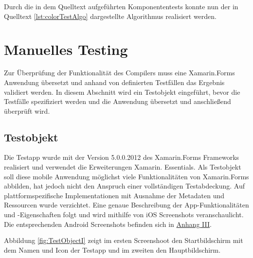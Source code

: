 Durch die in dem Quelltext aufgeführten Komponententests konnte nun der in Quelltext \ref{lst:colorTestAlgo} dargestellte Algorithmus realisiert werden. 
\newpage



\section{Manuelles Testing}
Zur Überprüfung der Funktionalität des Compilers muss eine Xamarin.Forms Anwendung übersetzt und anhand von definierten Testfällen das Ergebnis validiert werden.  In diesem Abschnitt wird ein Testobjekt eingeführt,  bevor die Testfälle spezifiziert werden und die Anwendung übersetzt und anschließend überprüft wird. 

\subsection{Testobjekt}
Die Testapp wurde mit der Version 5.0.0.2012 des Xamarin.Forms Frameworks realisiert und verwendet die Erweiterungen Xamarin. Essentials.  Als Testobjekt soll diese mobile Anwendung möglichst viele Funktionalitäten von Xamarin.Forms abbilden,  hat jedoch nicht den Anspruch einer vollständigen Testabdeckung.
Auf plattformspezifische Implementationen mit Ausnahme der Metadaten und Ressourcen wurde verzichtet.  Eine genaue Beschreibung der App-Funktionalitäten und -Eigenschaften folgt und wird mithilfe von iOS Screenshots veranschaulicht.  Die entsprechenden Android Screenshots befinden sich in \hyperref[chap:AnhangAndroidScreenshots]{Anhang III}.  

Abbildung \ref{fig:TestObjectI} zeigt im ersten Screenshoot den Startbildschirm mit dem Namen und Icon der Testapp und im zweiten den Hauptbildschirm.  


